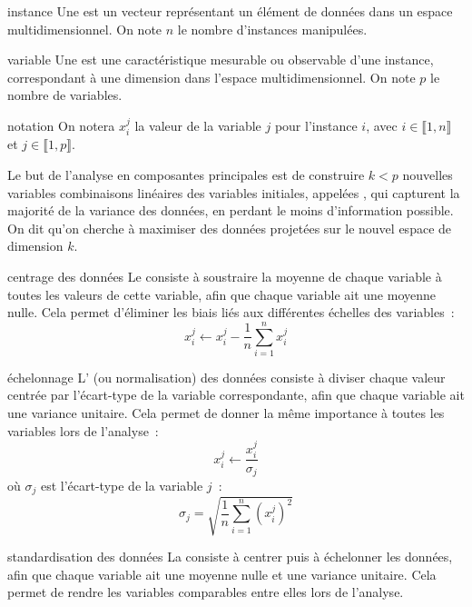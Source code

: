 \begin{definition}{}{instance}
    Une  est un vecteur représentant un élément de données dans un espace multidimensionnel. On note $n$ le nombre d'instances manipulées.
\end{definition}
\begin{definition}{}{variable}
    Une  est une caractéristique mesurable ou observable d'une instance, correspondant à une dimension dans l'espace multidimensionnel. On note $p$ le nombre de variables.
\end{definition}

\begin{definition}{}{notation}
    On notera $x_i^j$ la valeur de la variable $j$ pour l'instance $i$, avec $i \in \llbracket 1, n \rrbracket$ et $j \in \llbracket 1, p \rrbracket$.
\end{definition}

Le but de l'analyse en composantes principales est de construire $k<p$ nouvelles variables combinaisons linéaires des variables initiales, appelées , qui capturent la majorité de la variance des données, en perdant le moins d'information possible. On dit qu'on cherche à maximiser  des données projetées sur le nouvel espace de dimension $k$.

\begin{definition}{}{centrage des données}
    Le  consiste à soustraire la moyenne de chaque variable à toutes les valeurs de cette variable, afin que chaque variable ait une moyenne nulle. Cela permet d'éliminer les biais liés aux différentes échelles des variables~:
    $$x_i^j \leftarrow x_i^j - \frac{1}{n}\sum_{i=1}^n x_i^j$$
\end{definition}

\begin{definition}{}{échelonnage}
    L' (ou normalisation) des données consiste à diviser chaque valeur centrée par l'écart-type de la variable correspondante, afin que chaque variable ait une variance unitaire. Cela permet de donner la même importance à toutes les variables lors de l'analyse~:
    $$x_i^j \leftarrow \frac{x_i^j}{\sigma_j}$$
    où $\sigma_j$ est l'écart-type de la variable $j$~:
    $$\sigma_j = \sqrt{\frac{1}{n}\sum_{i=1}^n (x_i^j)^2}$$
\end{definition}

\begin{definition}{}{standardisation des données}
    La  consiste à centrer puis à échelonner les données, afin que chaque variable ait une moyenne nulle et une variance unitaire. Cela permet de rendre les variables comparables entre elles lors de l'analyse.
\end{definition}

